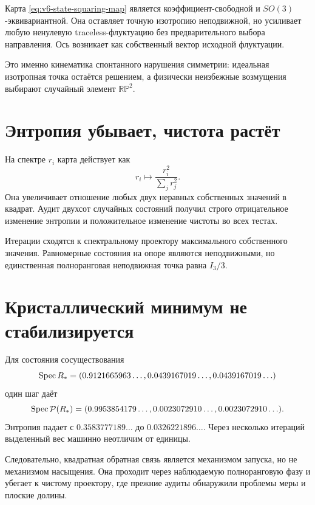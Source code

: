 \begin{theorem}
Карта \eqref{eq:v6-state-squaring-map} является коэффициент-свободной и
$SO(3)$-эквивариантной. Она оставляет точную изотропию неподвижной, но
усиливает любую ненулевую traceless-флуктуацию без предварительного выбора
направления. Ось возникает как собственный вектор исходной флуктуации.
\end{theorem}

Это именно кинематика спонтанного нарушения симметрии: идеальная
изотропная точка остаётся решением, а физически неизбежные возмущения
выбирают случайный элемент $\mathbb{RP}^2$.

\section{Энтропия убывает, чистота растёт}

На спектре $r_i$ карта действует как
\begin{equation}
 r_i\longmapsto\frac{r_i^2}{\sum_jr_j^2}.
\end{equation}
Она увеличивает отношение любых двух неравных собственных значений в
квадрат. Аудит двухсот случайных состояний получил строго отрицательное
изменение энтропии и положительное изменение чистоты во всех тестах.

Итерации сходятся к спектральному проектору максимального собственного
значения. Равномерные состояния на опоре являются неподвижными, но
единственная полноранговая неподвижная точка равна $I_3/3$.

\section{Кристаллический минимум не стабилизируется}

Для состояния сосуществования
\begin{equation}
 \operatorname{Spec} R_*=(0.9121665963\ldots,
 0.0439167019\ldots,0.0439167019\ldots)
\end{equation}
один шаг даёт
\begin{equation}
 \operatorname{Spec}\mathcal P(R_*)
 =(0.9953854179\ldots,
 0.0023072910\ldots,0.0023072910\ldots).
 \label{eq:v6-square-map-overshoot}
\end{equation}
Энтропия падает с $0.3583777189\ldots$ до $0.0326221896\ldots$.
Через несколько итераций выделенный вес машинно неотличим от единицы.

Следовательно, квадратная обратная связь является механизмом запуска, но
не механизмом насыщения. Она проходит через наблюдаемую полноранговую фазу
и убегает к чистому проектору, где прежние аудиты обнаружили проблемы
меры и плоские долины.

